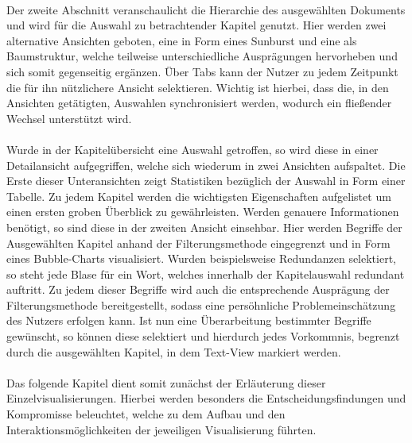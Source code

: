 \\
Der zweite Abschnitt veranschaulicht die Hierarchie des ausgew\"ahlten Dokuments und wird f\"ur die Auswahl zu betrachtender Kapitel genutzt. Hier werden zwei alternative Ansichten geboten, eine in Form eines Sunburst und eine als Baumstruktur, welche teilweise unterschiedliche Auspr\"agungen hervorheben und sich somit gegenseitig erg\"anzen. \"Uber Tabs kann der Nutzer zu jedem Zeitpunkt die f\"ur ihn n\"utzlichere Ansicht selektieren. Wichtig ist hierbei, dass die, in den Ansichten get\"atigten, Auswahlen synchronisiert werden, wodurch ein flie{\ss}ender Wechsel unterst\"utzt wird. \\
\\
Wurde in der Kapitel\"ubersicht eine Auswahl getroffen, so wird diese in einer Detailansicht aufgegriffen, welche sich wiederum in zwei Ansichten aufspaltet. Die Erste dieser Unteransichten zeigt Statistiken bez\"uglich der Auswahl in Form einer Tabelle. Zu jedem Kapitel werden die wichtigsten Eigenschaften aufgelistet um einen ersten groben \"Uberblick zu gew\"ahrleisten. Werden genauere Informationen ben\"otigt, so sind diese in der zweiten Ansicht einsehbar. Hier werden Begriffe der Ausgew\"ahlten Kapitel anhand der Filterungsmethode eingegrenzt und in Form eines Bubble-Charts visualisiert. Wurden beispielsweise Redundanzen selektiert, so steht jede Blase f\"ur ein Wort, welches innerhalb der Kapitelauswahl redundant auftritt. Zu jedem dieser Begriffe wird auch die entsprechende Auspr\"agung der Filterungsmethode bereitgestellt, sodass eine pers\"ohnliche Problemeinsch\"atzung des Nutzers erfolgen kann. Ist nun eine \"Uberarbeitung bestimmter Begriffe gew\"unscht, so k\"onnen diese selektiert und hierdurch jedes Vorkommnis, begrenzt durch die ausgew\"ahlten Kapitel, in dem Text-View markiert werden.\\
\\
Das folgende Kapitel dient somit zun\"achst der Erl\"auterung dieser Einzelvisualisierungen. Hierbei werden besonders die Entscheidungsfindungen und Kompromisse beleuchtet, welche zu dem Aufbau und den Interaktionsm\"oglichkeiten der jeweiligen Visualisierung f\"uhrten.

